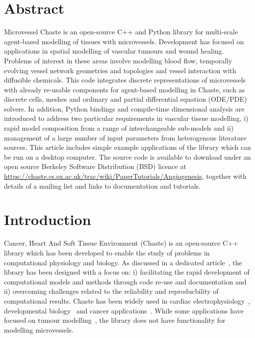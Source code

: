 \documentclass[10pt,letterpaper]{article}
\begin{document}
\section*{Abstract}
Microvessel Chaste is an open-source C++ and Python library for multi-scale agent-based modelling of tissues with microvessels. Development has focused on applications in spatial modelling of vascular tumours and wound healing. Problems of interest in these areas involve modelling blood flow, temporally evolving vessel network geometries and topologies and vessel interaction with diffusible chemicals. This code integrates discrete representations of microvessels with already re-usable components for agent-based modelling in Chaste, such as discrete cells, meshes and ordinary and partial differential equation (ODE/PDE) solvers. In addition, Python bindings and compile-time dimensional analysis are introduced to address two particular requirements in vascular tissue modelling, i) rapid model composition from a range of interchangeable sub-models and ii) management of a large number of input parameters from heterogenous literature sources. This article includes simple example applications of the library which can be run on a desktop computer. The source code is available to download under an open source Berkeley Software Distribution (BSD) licence at \url{https://chaste.cs.ox.ac.uk/trac/wiki/PaperTutorials/Angiogenesis}, together with details of a mailing list and links to documentation and tutorials.

\linenumbers

\section*{Introduction}
Cancer, Heart And Soft Tissue Environment (Chaste) is an open-source C++ library which has been developed to enable the study of problems in computational physiology and biology. As discussed in a dedicated article~\cite{Mirams2013}, the library has been designed with a focus on: i) facilitating the rapid development of computational models and methods through code re-use and documentation and ii) overcoming challenges related to the reliability and reproducbility of computational results. Chaste has been widely used in cardiac electrophysiology~\cite{Cooper2015}, developmental biology~\cite{Tetley2016} and cancer applications~\cite{Dunn2016}. While some applications have focused on tumour modelling~\cite{Figueredo2013}, the library does not have functionality for modelling microvessels. 
\end{document}
